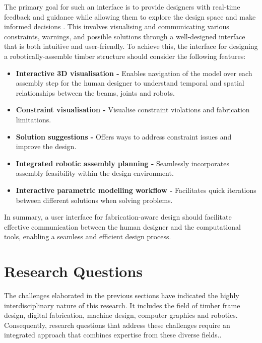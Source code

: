 The primary goal for such an interface is to provide designers with real-time feedback and guidance while allowing them to explore the design space and make informed decisions \parencite{frichMappingLandscapeCreativity2019, puentesMakingGesturesDesign2015}. This involves visualising and communicating various constraints, warnings, and possible solutions through a well-designed interface that is both intuitive and user-friendly. To achieve this, the interface for designing a robotically-assemble timber structure should consider the following features: 

\begin{itemize}
	\item \textbf{Interactive 3D visualisation - }Enables navigation of the model over each assembly step for the human designer to understand temporal and spatial relationships between the beams, joints and robots.

	\item \textbf{Constraint visualisation - }Visualise constraint violations and fabrication limitations. 

	\item \textbf{Solution suggestions - }Offers ways to address constraint issues and improve the design.

	\item \textbf{Integrated robotic assembly planning -} Seamlessly incorporates assembly feasibility within the design environment.

	\item \textbf{Interactive parametric modelling workflow - }Facilitates quick iterations between different solutions when solving problems.

\end{itemize}
In summary, a user interface for fabrication-aware design should facilitate effective communication between the human designer and the computational tools, enabling a seamless and efficient design process. 

\section{Research Questions}

The challenges elaborated in the previous sections have indicated the highly interdisciplinary nature of this research. It includes the field of timber frame design, digital fabrication, machine design, computer graphics and robotics. Consequently, research questions that address these challenges require an integrated approach that combines expertise from these diverse fields..

